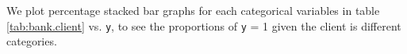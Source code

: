 \documentclass[11pt,a4paper]{article}
\begin{document}

    
    We plot percentage stacked bar graphs for each categorical variables in table \ref{tab:bank.client} vs. \texttt{y}, to see the proportions of \texttt{y} = 1 given the client is different categories.
    
    \noindent
    \begin{figure}[H]
        \centering
        \qquad
    

\end{figure}
\end{document}
